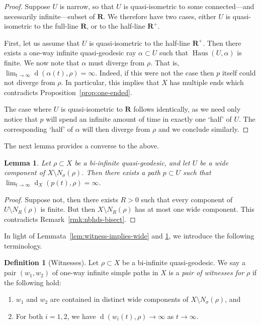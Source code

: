\documentclass[11pt,a4paper]{amsart}
\DeclareMathOperator{\dHaus}{Haus}
\DeclareMathOperator{\dist}{d}
\newcommand{\R}{\mathbf{R}}
\newtheorem{lemma}[theorem]{Lemma}
\theoremstyle{definition}
\newtheorem{definition}[theorem]{Definition}
\begin{document}
\begin{proof}
    Suppose $U$ is narrow, so that $U$ is quasi-isometric to some connected---and necessarily infinite---subset of $\R$. We therefore have two cases, either $U$ is quasi-isometric to the full-line $\R$, or to the half-line $\R^+$.

    First, let us assume that $U$ is quasi-isometric to the half-line $\R^+$. Then there exists a one-way infinite quasi-geodesic ray $\alpha \subset U$ such that $\dHaus(U, \alpha)$ is finite. We now note that $\alpha$ must diverge from $\rho$. That is,  $\lim_{t \to \infty} \dist(\alpha(t), \rho) = \infty$. Indeed, if this were not the case then $p$ itself could not diverge from $\rho$.
    In particular, this implies that $X$ has multiple ends which contradicts Proposition~\ref{prop:one-ended}. 

    The case where $U$ is quasi-isometric to $\R$ follows identically, as we need only notice that $p$ will spend an infinite amount of time in exactly one `half' of $U$. The corresponding `half' of $\alpha$ will then diverge from $\rho$ and we conclude similarly. 
\end{proof}

The next lemma provides a converse to the above. 

\begin{lemma}\label{lem:wide-implies-witness}
    Let $\rho \subset X$ be a bi-infinite quasi-geodesic, and let $U$ be a wide component of $X \setminus N_\sigma(\rho)$. Then there exists a path $p \subset U$ such that  $\lim_{t \to \infty} \dist_X(p(t), \rho) = \infty$.  
\end{lemma}

\begin{proof}
    Suppose not, then there exists $R > 0$ such that every component of $U \setminus N_R(\rho)$ is finite. But then $X \setminus N_R(\rho)$ has at most one wide component. This contradicts Remark~\ref{rmk:nbhds-bisect}.
\end{proof}

In light of Lemmata~\ref{lem:witness-implies-wide} and \ref{lem:wide-implies-witness}, we introduce the following terminology. 

\begin{definition}[Witnesses] 
    Let $\rho \subset X$ be a bi-infinite quasi-geodesic. We say a pair $(w_1,w_2)$ of one-way infinite simple paths in $X$ is a \emph{pair of witnesses for $\rho$} if the following hold:
    \begin{enumerate}
        \item $w_1$ and $w_2$ are contained in distinct wide components of $X \setminus N_\sigma(\rho)$, and
        \item For both $i = 1,2$, we have $ \dist(w_i(t), \rho) \to \infty$ as $t \to \infty$. 
    \end{enumerate}
\end{definition}
\end{document}
